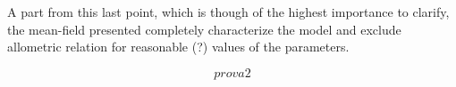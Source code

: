\documentclass[10pt]{article}
\begin{document}
A part from this last point, which is though of the highest importance to clarify,
the mean-field presented completely characterize the model and exclude
allometric relation for reasonable (?) values of the parameters.

\begin{equation}
  prova2
\end{equation}




\end{document}
